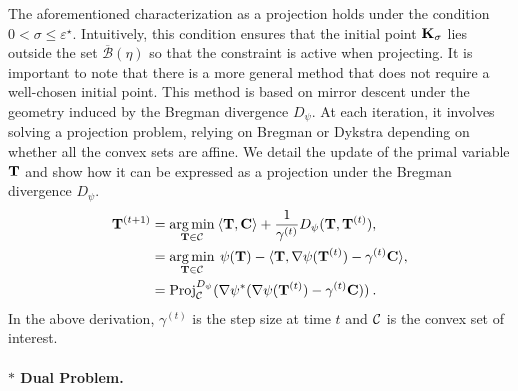 \begin{remark}
    The aforementioned characterization as a projection holds under the condition $0 < \sigma \leq \varepsilon^\star$. Intuitively, this condition ensures that the initial point ${\mathbf{K}}_\sigma$ lies outside the set $\overline{\mathcal{B}}(\eta)$ so that the constraint is active when projecting.
    It is important to note that there is a more general method that does not require a well-chosen initial point. This method is based on mirror descent under the geometry induced by the Bregman divergence $D_\psi$. At each iteration, it involves solving a projection problem, relying on Bregman or Dykstra depending on whether all the convex sets are affine. We detail the update of the primal variable ${\mathbf{T}}$ and show how it can be expressed as a projection under the Bregman divergence $D_\psi$.
    \begin{align}
    {\mathbf{T}}^{(t+1)} &= \operatorname*{arg\,min}_{{\mathbf{T}} \in {\mathcal{C}}} \: \langle {\mathbf{T}}, {\mathbf{C}} \rangle + \frac{1}{\gamma^{(t)}} D_{\psi}({\mathbf{T}}, {\mathbf{T}}^{(t)}), \\
    &= \operatorname*{arg\,min}_{{\mathbf{T}} \in {\mathcal{C}}} \: \psi({\mathbf{T}}) - \langle {\mathbf{T}}, \nabla \psi({\mathbf{T}}^{(t)}) - \gamma^{(t)} {\mathbf{C}} \rangle, \\
    &= \operatorname{Proj}^{D_\psi}_{{\mathcal{C}}}(\nabla \psi^*(\nabla \psi({\mathbf{T}}^{(t)}) - \gamma^{(t)} {\mathbf{C}})) \:.
    \end{align}
    In the above derivation, $\gamma^{(t)}$ is the step size at time $t$ and ${\mathcal{C}}$ is the convex set of interest.
\end{remark}    


\paragraph{$\ast$ Dual Problem.}

